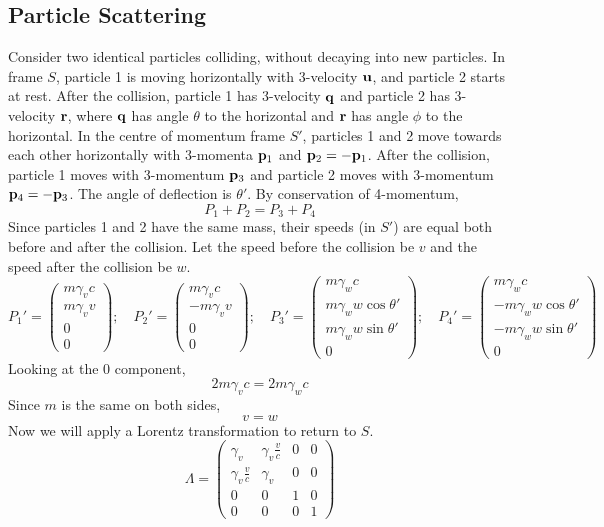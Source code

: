 \subsection{Particle Scattering}
Consider two identical particles colliding, without decaying into new particles. In frame $S$, particle 1 is moving horizontally with 3-velocity $\vb u$, and particle 2 starts at rest. After the collision, particle 1 has 3-velocity $\vb q$ and particle 2 has 3-velocity $\vb r$, where $\vb q$ has angle $\theta$ to the horizontal and $\vb r$ has angle $\phi$ to the horizontal. In the centre of momentum frame $S'$, particles 1 and 2 move towards each other horizontally with 3-momenta $\vb p_1$ and $\vb p_2 = -\vb p_1$. After the collision, particle 1 moves with 3-momentum $\vb p_3$ and particle 2 moves with 3-momentum $\vb p_4 = -\vb p_3$. The angle of deflection is $\theta'$. By conservation of 4-momentum,
\[ P_1 + P_2 = P_3 + P_4 \]
Since particles 1 and 2 have the same mass, their speeds (in $S'$) are equal both before and after the collision. Let the speed before the collision be $v$ and the speed after the collision be $w$.
\[ P_1' = \begin{pmatrix}
		m\gamma_v c \\
		m\gamma_v v \\
		0           \\
		0
	\end{pmatrix};\quad P_2' = \begin{pmatrix}
		m\gamma_v c  \\
		-m\gamma_v v \\
		0            \\
		0
	\end{pmatrix};\quad P_3' = \begin{pmatrix}
		m\gamma_w c             \\
		m\gamma_w w \cos\theta' \\
		m\gamma_w w \sin\theta' \\
		0
	\end{pmatrix};\quad P_4' = \begin{pmatrix}
		m\gamma_w c              \\
		-m\gamma_w w \cos\theta' \\
		-m\gamma_w w \sin\theta' \\
		0
	\end{pmatrix}  \]
Looking at the 0 component,
\[ 2 m\gamma_v c = 2m\gamma_w c \]
Since $m$ is the same on both sides,
\[ v = w \]
Now we will apply a Lorentz transformation to return to $S$.
\[ \Lambda = \begin{pmatrix}
    \gamma_v & \gamma_v \frac{v}{c} & 0 & 0 \\
    \gamma_v \frac{v}{c} & \gamma_v & 0 & 0 \\
    0 & 0 & 1 & 0 \\
    0 & 0 & 0 & 1
\end{pmatrix} \]
